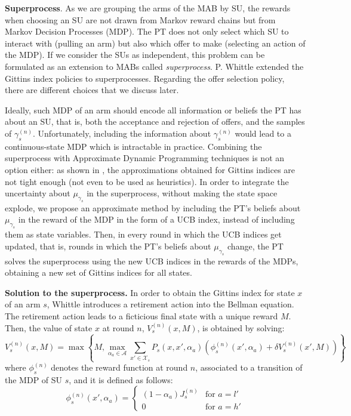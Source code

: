 \textbf{Superprocess}. 
As we are grouping the arms of the MAB by SU, the rewards when choosing an SU are not drawn from Markov reward chains but from Markov Decision Processes (MDP). The PT does not only select which SU to interact with (pulling an arm) but also which offer to make (selecting an action of the MDP). 
If we consider the SUs as independent, this problem can be formulated as an extension to MABs called \textit{superprocess}. P. Whittle \cite{ref:Whittle1980} extended the Gittins index policies to superprocesses. Regarding the offer selection policy, there are different choices that we discuss later.


Ideally, such MDP of an arm should encode all information or beliefs the PT has about an SU, that is, both the acceptance and rejection of offers, and the samples of $\gamma_s^{(n)}$. 
Unfortunately, including the information about $\gamma_s^{(n)}$ would lead to a continuous-state MDP which is intractable in practice. 
Combining the superprocess with Approximate Dynamic Programming techniques is not an option either: as shown in \cite{ref:Pandey2007}, the approximations obtained for Gittins indices are not tight enough (not even to be used as heuristics). In order to integrate the uncertainty about $\mu_{\gamma_s}$ in the superprocess, without making the state space explode, we propose an approximate method by including the PT's beliefs about $\mu_{\gamma_s}$ in the reward of the MDP in the form of a UCB index, instead of including them as state variables. Then, in every round in which the UCB indices get updated, that is, rounds in which the PT's beliefs about $\mu_{\gamma_s}$ change, the PT solves the superprocess using the new UCB indices in the rewards of the MDPs, obtaining a new set of Gittins indices for all states.


\textbf{Solution to the superprocess.} In order to obtain the Gittins index for state $x$ of an arm $s$, Whittle introduces a retirement action into the Bellman equation.
The retirement action leads to a ficticious final state with a unique reward $M$. Then, the value of state $x$ at round $n$, $V_s^{(n)}(x,M)$, is obtained by solving:
\begin{equation}\label{eq:MDPret}
V_s^{(n)}(x,M) = \max\left\{M, \max_{\alpha_a \in \mathcal{A}} \sum_{x' \in \mathcal{X}_s} P_s(x,x',\alpha_a)\left(\phi_s^{(n)}(x',\alpha_a)+\delta V_s^{(n)}(x',M)\right)\right\}
\end{equation}
where $\phi_s^{(n)}$ denotes the reward function at round $n$, associated to a transition of the MDP of SU $s$, and it is defined as follows:
\begin{equation}
\phi_s^{(n)}(x',\alpha_a) = 
\begin{cases}
    (1 - \alpha_a) J_s^{(n)} & \text{for } a = l'\\
    0 & \text{for } a = h'
   \end{cases}
\end{equation}

